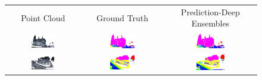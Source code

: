     \begin{figure}[h!]
        \begin{tabular}{ccc}
            Point Cloud & Ground Truth & Prediction-Deep Ensembles \\
            \includegraphics[width=0.33\textwidth, height=0.18\textheight]{images/seg_output/sem3d_seg_output/1_RGB.pdf} &
            \includegraphics[width=0.33\textwidth, height=0.18\textheight]{images/seg_output/sem3d_seg_output/1_GT.pdf}& 
            \includegraphics[width=0.33\textwidth, height=0.18\textheight]{images/seg_output/sem3d_seg_output/1_Pred.pdf}\\

            \includegraphics[width=0.33\textwidth, height=0.18\textheight]{images/seg_output/sem3d_seg_output/2_RGB.pdf} &
            \includegraphics[width=0.33\textwidth, height=0.18\textheight]{images/seg_output/sem3d_seg_output/2_GT.pdf}& 
            \includegraphics[width=0.33\textwidth, height=0.18\textheight]{images/seg_output/sem3d_seg_output/2_Pred.pdf}\\


\end{tabular}
\end{figure}
